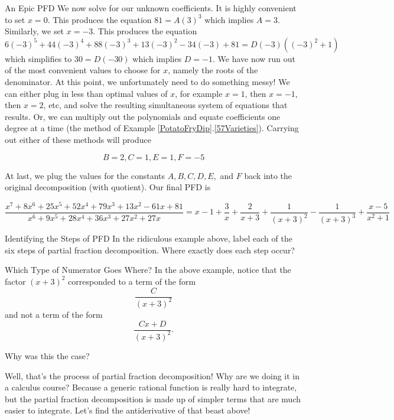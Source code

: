 \begin{example}{An Epic PFD}
We now solve for our unknown coefficients.  It is highly convenient to set $x=0$. This produces the equation $ 81= A (3)^3 $ which implies $A=3$.  Similarly, we set $x=-3$. This produces the equation $$6 (-3)^5+44 (-3)^4+88 (-3)^3+13 (-3)^2-34 (-3)+81=D(-3) ((-3)^2+1)$$ which simplifies to $ 30=D(-30) $ which implies $D=-1$.  We have now run out of the most convenient values to choose for $x$, namely the roots of the denominator.  At this point, we unfortunately need to do something messy!  We can either plug in less than optimal values of $x$, for example $x=1$, then $x=-1$, then $x=2$, etc, and solve the resulting simultaneous system of equations that results.  Or, we can multiply out the polynomials and equate coefficients one degree at a time (the method of Example \ref{PotatoFryDip}.\ref{57Varieties}).  Carrying out either of these methods will produce

$$ B=2, C=1, E=1, F=-5 $$

At last, we plug the values for the constants $A,B,C,D,E,$ and $F$ back into the original decomposition (with quotient).  Our final PFD is 

$$ \frac{x^7+8 x^6+25 x^5+52 x^4+79 x^3+13 x^2-61 x+81}{x^6+9 x^5+28 x^4+36 x^3+27 x^2+27 x} = x-1 + \frac{3}{x} + \frac{2}{x + 3} + \frac{1}{(x + 3)^2} - \frac{1}{(x + 3)^3} + \frac{x - 5}{x^2 + 1} $$ 

\end{example}

\begin{exercise}{ Identifying the Steps of PFD \Coffeecup}
In the ridiculous example above, label each of the six steps of partial fraction decomposition.  Where exactly does each step occur?
\end{exercise}

\begin{exercise}{ Which Type of Numerator Goes Where? \Coffeecup}
In the above example, notice that the factor $(x+3)^2$ corresponded to a term of the form $$\frac{C}{(x+3)^2}$$ and not a term of the form $$\frac{Cx+D}{(x+3)^2}.$$

Why was this the case?


\end{exercise}

Well, that's the process of partial fraction decomposition!  Why are we doing it in a calculus course?  Because a generic rational function is really hard to integrate, but the partial fraction decomposition is made up of simpler terms that are much easier to integrate.  Let's find the antiderivative of that beast above!  

